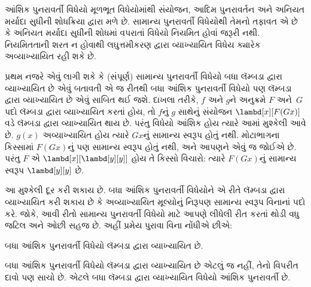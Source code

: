 \begingroup
\makeatletter{}\makeatother

\label{guunit:OLP-0381}


આંશિક પુનરાવર્તી વિધેયો મૂળભૂત વિધેયોમાંથી
સંયોજન, આદિમ પુનરાવર્તન અને અનિયત મર્યાદા
સુધીની શોધક્રિયા દ્વારા મળે છે. સામાન્ય પુનરાવર્તી
વિધેયોથી તેમનો તફાવત એ છે કે અનિયત મર્યાદા સુધીની
શોધમાં વપરાતાં વિધેયો નિયમિત હોવાં જરૂરી નથી.
નિયમિતતાની શરત ન હોવાથી લઘુત્તમીકરણ દ્વારા
વ્યાખ્યાયિત વિધેય ક્યારેક અવ્યાખ્યાયિત રહી શકે છે.

પ્રથમ નજરે એવું લાગી શકે કે (સંપૂર્ણ) સામાન્ય પુનરાવર્તી
વિધેયો બધા લૅમ્બડા દ્વારા વ્યાખ્યાયિત છે એવું બતાવતી એ જ
રીતથી બધા આંશિક પુનરાવર્તી વિધેયો પણ
લૅમ્બડા દ્વારા વ્યાખ્યાયિત છે એવું સાબિત થઈ જશે.
દાખલા તરીકે, $f$ અને $g$ને અનુક્રમે $F$ અને~$G$
પદો લૅમ્બડા દ્વારા વ્યાખ્યાયિત કરતાં હોય, તો $f$નું $g$ સાથેનું
સંયોજન $\lambd[x][F (G x)]$ વડે લૅમ્બડા દ્વારા વ્યાખ્યાયિત
થાય છે. પરંતુ વિધેયો આંશિક હોય ત્યારે આમાં
મુશ્કેલી આવે છે. $g(x)$ અવ્યાખ્યાયિત હોય ત્યારે
$G x$નું સામાન્ય સ્વરૂપ હોતું નથી. મોટાભાગના
કિસ્સામાં $F (G x)$નું પણ સામાન્ય સ્વરૂપ હોતું
નથી, અને આપણને એવું જ જોઈએ છે. પરંતુ
$F$ એ $\lambd[x][\lambd[y][y]]$ હોય તે કિસ્સો
વિચારો: ત્યારે $F (G x)$નું સામાન્ય સ્વરૂપ
$\lambd[y][y]$ છે.

આ મુશ્કેલી દૂર કરી શકાય છે. બધા આંશિક પુનરાવર્તી
વિધેયોને એ રીતે લૅમ્બડા દ્વારા વ્યાખ્યાયિત કરી શકાય છે કે
અવ્યાખ્યાયિત મૂલ્યોનું નિરૂપણ સામાન્ય સ્વરૂપ
વિનાનાં પદો કરે. જોકે, આવી રીતો સામાન્ય પુનરાવર્તી
વિધેયો માટે આપણે લીધેલી રીત કરતાં થોડી વધુ
જટિલ અને ઓછી સહજ છે. અહીં પ્રમેય પુરાવા વિના
નોંધીએ છીએ:

\begin{thm}
  બધા આંશિક પુનરાવર્તી વિધેયો લૅમ્બડા દ્વારા વ્યાખ્યાયિત છે.
\end{thm}
\endgroup

\begingroup
\makeatletter{}\makeatother

\label{guunit:OLP-0382}


બધા આંશિક પુનરાવર્તી વિધેયો લૅમ્બડા દ્વારા વ્યાખ્યાયિત
છે એટલું જ નહીં, તેનો વિપરીત દાવો પણ સાચો છે.
એટલે બધા લૅમ્બડા દ્વારા વ્યાખ્યાયિત વિધેયો આંશિક
પુનરાવર્તી છે.


